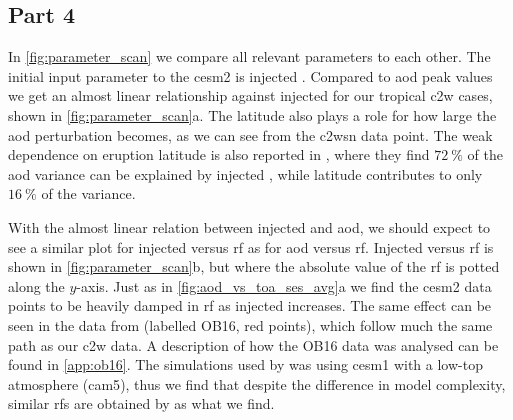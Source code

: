 \documentclass[twocol]{ametsocV6.1}
\newcommand{\iso}[1][i]{{#1}njected \ce{SO2}}
\begin{document}
\subsection{Part 4}

In \ref{fig:parameter_scan} we compare all relevant parameters to each other. The initial input
parameter to the \gls{cesm2} is injected . Compared to \gls{aod} peak values we
get an almost linear relationship against \iso{} for our tropical \gls{c2w} cases, shown
in \ref{fig:parameter_scan}a. The latitude also plays a role for how large the \gls{aod}
perturbation becomes, as we can see from the \gls{c2wsn} data point. The weak dependence
on eruption latitude is also reported in \citet{marshall2019}, where they find
\(\SI{72}{\percent}\) of the \gls{aod} variance can be explained by \iso{}, while
latitude contributes to only \(\SI{16}{\percent}\) of the variance.

With the almost linear relation between injected  and \gls{aod}, we should
expect to see a similar plot for \iso{} versus \gls{rf} as for \gls{aod} versus
\gls{rf}. \iso[I] versus \gls{rf} is shown in \ref{fig:parameter_scan}b, but where the
absolute value of the \gls{rf} is potted along the \(y\)-axis. Just as in
\ref{fig:aod_vs_toa_ses_avg}a we find the \gls{cesm2} data points to be heavily damped in
\gls{rf} as \iso{} increases. The same effect can be seen in the data from
\citet{ottobliesner2016} (labelled OB16, red points), which follow much the same path as
our \gls{c2w} data. A description of how the OB16 data was analysed can be found in
\ref{app:ob16}. The simulations used by \citet{ottobliesner2016} was using \gls{cesm1}
with a low-top atmosphere (\gls{cam5}), thus we find that despite the difference in
model complexity, similar \glspl{rf} are obtained by \citet{ottobliesner2016} as what we
find.
\end{document}
